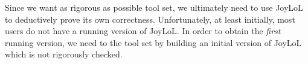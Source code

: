 
\startJoyLoLCoAlg[title=Minimal Lua implementation][minLua]

\startsection[title=Bootstrapping JoyLoL]

Since we want as rigorous as possible tool set, we ultimately need to use 
JoyLoL to deductively prove its own correctness. Unfortunately, at least 
initially, most users do not have a running version of JoyLoL. In order to 
obtain the \emph{first} running version, we need to  the 
tool set by building an initial version of JoyLoL which is not rigorously 
checked. 

\stopsection

\stopJoyLoLCoAlg